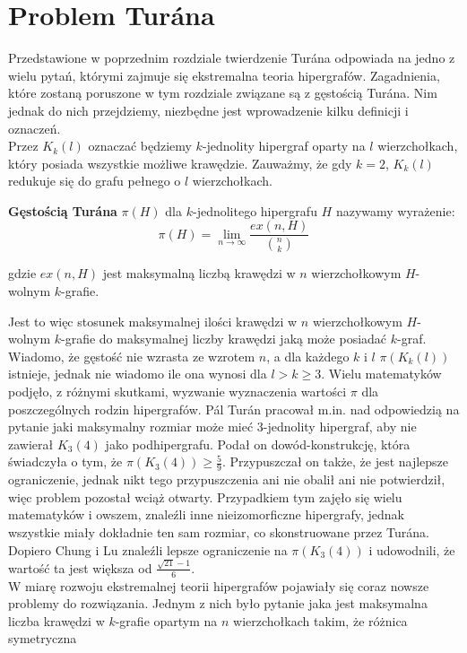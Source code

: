 \documentclass[miz,woman]{mgrwms}
\begin{document}
\chapter{Problem Tur\'ana}
Przedstawione w poprzednim rozdziale twierdzenie Tur\'ana odpowiada na jedno z wielu pytań, którymi zajmuje się ekstremalna
teoria hipergrafów. Zagadnienia, które zostaną poruszone w tym rozdziale związane są z gęstością Tur\'ana. Nim jednak do nich
przejdziemy, niezbędne jest wprowadzenie kilku definicji i oznaczeń.\\
Przez $K_k(l)$ oznaczać będziemy $k$-jednolity hipergraf oparty na $l$ wierzchołkach, który posiada wszystkie możliwe krawędzie.
Zauważmy, że gdy $k=2$, $K_k(l)$ redukuje się do grafu pełnego o $l$ wierzchołkach.
\begin{defi}
 \textbf{Gęstością Tur\'ana} $\pi (H)$ dla $k$-jednolitego hipergrafu $H$ nazywamy wyrażenie:
\begin{equation}
 \pi(H)=\lim_{n \to \infty} \frac{ex(n,H)}{{n \choose k}}
\end{equation}

gdzie $ex(n,H)$ jest maksymalną liczbą krawędzi w $n$ wierzchołkowym $H$-wolnym $k$-grafie.
\end{defi}
Jest to więc stosunek maksymalnej ilości krawędzi w $n$ wierzchołkowym $H$-wolnym $k$-grafie do maksymalnej liczby krawędzi
jaką może posiadać $k$-graf. Wiadomo, że gęstość nie wzrasta ze wzrotem $n$, a dla każdego $k$ i $l$ $ \pi(K_k(l))$ istnieje,
 jednak nie wiadomo ile ona wynosi dla $l>k\geq 3$. Wielu matematyków
podjęło, z różnymi skutkami, wyzwanie wyznaczenia wartości $\pi$ dla poszczególnych rodzin hipergrafów. P\'al Tur\'an pracował
m.in. nad odpowiedzią na pytanie jaki maksymalny rozmiar może mieć 3-jednolity hipergraf, aby nie zawierał $K_3(4)$ jako
podhipergrafu. Podał on dowód-konstrukcję, która świadczyła o tym, że $\pi(K_3(4))\geq \frac{5}{9}$. Przypuszczał on także, 
że jest najlepsze ograniczenie, jednak nikt tego przypuszczenia ani nie obalił ani nie potwierdził, więc problem
pozostał wciąż otwarty. Przypadkiem tym zajęło się wielu matematyków i owszem, znaleźli inne nieizomorficzne hipergrafy, jednak
wszystkie miały dokładnie ten sam rozmiar, co skonstruowane przez Tur\'ana. Dopiero Chung i Lu znaleźli lepsze ograniczenie 
na $\pi(K_3(4))$ i udowodnili, że wartość ta jest większa od $\frac{\sqrt{21}-1}{6}$.\\
W miarę rozwoju ekstremalnej teorii hipergrafów pojawiały się coraz nowsze problemy do rozwiązania. Jednym z nich było 
pytanie jaka jest maksymalna liczba krawędzi w $k$-grafie opartym na $n$ wierzchołkach takim, że różnica symetryczna
\end{document}
